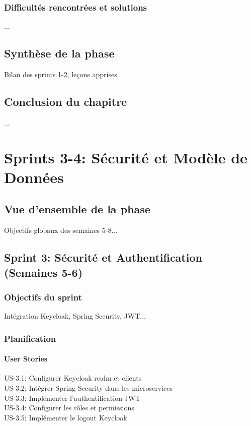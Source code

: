 \documentclass[12pt,a4paper]{report}
\begin{document}
\subsection{Difficultés rencontrées et solutions}
...

\section{Synthèse de la phase}
Bilan des sprints 1-2, leçons apprises...

\section{Conclusion du chapitre}
...

\chapter{Sprints 3-4: Sécurité et Modèle de Données}
\label{chap:sprints3-4}

\section{Vue d'ensemble de la phase}
Objectifs globaux des semaines 5-8...

\section{Sprint 3: Sécurité et Authentification (Semaines 5-6)}
\subsection{Objectifs du sprint}
Intégration Keycloak, Spring Security, JWT...

\subsection{Planification}
\subsubsection{User Stories}
US-3.1: Configurer Keycloak realm et clients \\
US-3.2: Intégrer Spring Security dans les microservices \\
US-3.3: Implémenter l'authentification JWT \\
US-3.4: Configurer les rôles et permissions \\
US-3.5: Implémenter le logout Keycloak
\end{document}

